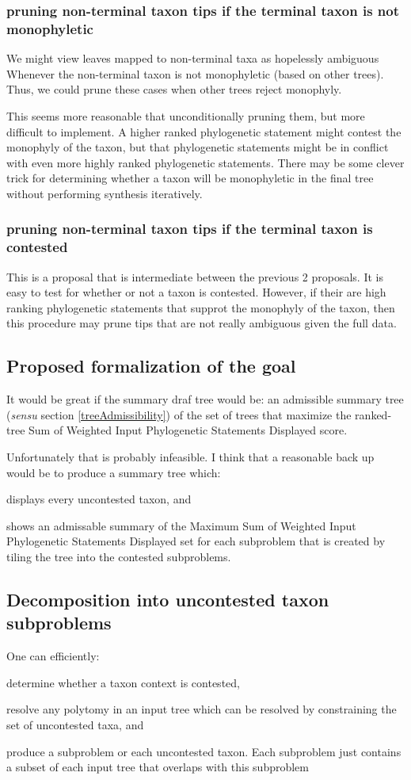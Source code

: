 \documentclass[11pt]{article}
\newcommand{\ps}{phylogenetic statement\xspace}
\newcommand{\pss}{phylogenetic statements\xspace}
\newcommand{\PSs}{Phylogenetic Statements\xspace}
\newcommand{\SWIPSD}{Sum of Weighted Input \PSs Displayed\xspace}
\newcommand{\MSWIPSD}{Maximum \SWIPSD \xspace}
\begin{document}
\subsubsection{pruning non-terminal taxon tips if the terminal taxon is not monophyletic}
We might view leaves mapped to non-terminal taxa as hopelessly ambiguous Whenever the non-terminal
    taxon is not monophyletic (based on other trees).
Thus, we could prune these cases when other trees reject monophyly.

This seems more reasonable that unconditionally pruning them, but more difficult to implement.
A higher ranked \ps might contest the monophyly of the taxon, but that \pss might be 
    in conflict with even more highly ranked \pss.
There may be some clever trick for determining whether a taxon will be monophyletic in the
    final tree without performing synthesis iteratively.

\subsubsection{pruning non-terminal taxon tips if the terminal taxon is contested}
This is a proposal that is intermediate between the previous 2 proposals.
It is easy to test for whether or not a taxon is contested.
However, if their are high ranking \pss that supprot the monophyly of the taxon,
    then this procedure may prune tips that are not really ambiguous given 
    the full data.

\subsection{Proposed formalization of the goal}
It would be great if the summary draf tree would be:
    an admissible summary tree ({\em sensu} section \ref{treeAdmissibility}) of the set of trees
    that maximize the ranked-tree \SWIPSD score.

Unfortunately that is probably infeasible.  I think that a reasonable back up would be to 
    produce a summary tree which:
\begin{compactenum}
    \item displays every uncontested taxon, and
    \item shows an admissable summary of the \MSWIPSD set for each subproblem that is
       created by tiling the tree into the contested subproblems.
\end{compactenum}
\subsection{Decomposition into uncontested taxon subproblems}
One can efficiently:
\begin{compactenum}
    \item determine whether a taxon context is contested,
    \item resolve any polytomy in an input tree which can be resolved by constraining
        the set of uncontested taxa, and
    \item produce a subproblem or each uncontested taxon. Each subproblem just contains
        a subset of each input tree that overlaps with this subproblem
\end{compactenum}
\end{document}
